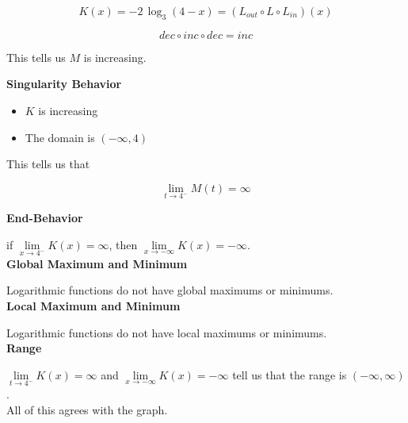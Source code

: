 \documentclass{ximera}
\begin{document}
\begin{example}
\[ K(x) = -2 \, \log_3(4-x) = (L_{out} \circ L \circ L_{in})(x) \] 


\[ dec \circ inc \circ dec = inc \]


This tells us $M$ is increasing.





\textbf{Singularity Behavior}

\begin{itemize}
\item $K$ is increasing
\item The domain is $(-\infty, 4)$
\end{itemize}


This tells us that

\[
\lim\limits_{t \to 4^-} M(t) = \infty
\]





\textbf{End-Behavior}


if  $\lim\limits_{x \to 4^-} K(x) = \infty$, then $\lim\limits_{x \to -\infty} K(x) = -\infty$. \\





\textbf{Global Maximum and Minimum}

Logarithmic functions do not have global maximums or minimums. \\






\textbf{Local Maximum and Minimum}

Logarithmic functions do not have local maximums or minimums. \\




\textbf{Range}



$\lim\limits_{t \to 4^-} K(x) = \infty$ and $\lim\limits_{x \to -\infty} K(x) = -\infty$ tell us that the range is $(-\infty, \infty)$. \\


All of this agrees with the graph.










\end{example}
\end{document}
